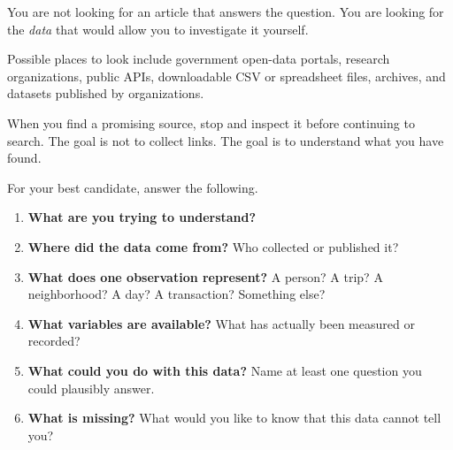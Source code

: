 \documentclass[11pt]{article}
\begin{document}
You are not looking for an article that answers the question. You are looking
for the \emph{data} that would allow you to investigate it yourself.

Possible places to look include government open-data portals, research
organizations, public APIs, downloadable CSV or spreadsheet files, archives,
and datasets published by organizations.

\begin{checkpoint}
When you find a promising source, stop and inspect it before continuing to
search. The goal is not to collect links. The goal is to understand what you
have found.
\end{checkpoint}

For your best candidate, answer the following.

\begin{enumerate}[leftmargin=*,itemsep=10pt]
  \item \textbf{What are you trying to understand?}

  \vspace{0.45in}

  \item \textbf{Where did the data come from?} Who collected or published it?

  \vspace{0.45in}

  \item \textbf{What does one observation represent?} A person? A trip? A
  neighborhood? A day? A transaction? Something else?

  \vspace{0.45in}

  \item \textbf{What variables are available?} What has actually been
  measured or recorded?

  \vspace{0.45in}

  \item \textbf{What could you do with this data?} Name at least one question
  you could plausibly answer.

  \vspace{0.45in}

  \item \textbf{What is missing?} What would you like to know that this data
  cannot tell you?

  \vspace{0.45in}
\end{enumerate}
\end{document}

